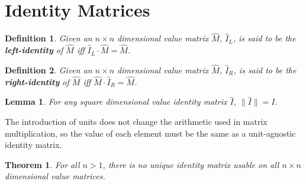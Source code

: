 \documentclass[10pt,letterpaper]{article}
\newtheorem{defn}{Definition}[section]
\newtheorem{lem}{Lemma}[section]
\newtheorem{thm}{Theorem}[section]
\numberwithin{equation}{section}
\begin{document}
\section{Identity Matrices}

\begin{defn}Given an $n \times n$ dimensional value matrix $\hat M$,
  $\hat I_L$, is said to be the \textbf{left-identity} of $\hat M$ iff
  $\hat I_L \cdot \hat M = \hat M$.\end{defn}

\begin{defn}Given an $n \times n$ dimensional value matrix $\hat M$,
  $\hat I_R$, is said to be the \textbf{right-identity} of $\hat M$
  iff $\hat M \cdot \hat I_R = \hat M$.\end{defn}

\begin{lem} \label{dimensional_identities_all_have_the_values_of_I}
  For any square dimensional value identity matrix $\hat I$, $\| \hat
  I \| = I$.\end{lem}

The introduction of units does not change the arithmetic used in
matrix multiplication, so the value of each element must be the same
as a unit-agnostic identity matrix.

\begin{thm}For all $n > 1$, there is no unique identity matrix usable
  on all $n \times n$ dimensional value matrices.\end{thm}
\end{document}
